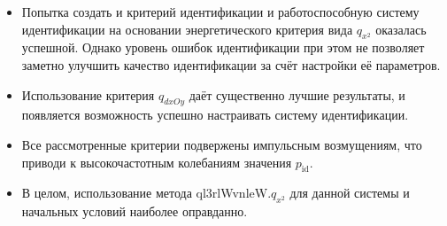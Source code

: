 \begin{itemize}

  \item
    Попытка создать и критерий идентификации и работоспособную систему идентификации
    на основании энергетического критерия вида $q_{x^2}$ оказалась успешной.
    Однако уровень ошибок идентификации при этом не позволяет
    заметно улучшить качество идентификации за счёт настройки её параметров.

  \item
    Использование критерия $q_{dxOy}$ даёт существенно лучшие результаты,
    и появляется возможность успешно настраивать систему идентификации.

  \item
    Все рассмотренные критерии подвержены импульсным возмущениям,
    что приводи к высокочастотным колебаниям значения $p_{\mathrm{id}}$.

  \item
    В целом, использование метода  ql3rlWvnleW.$q_{x^2}$ для данной системы
    и начальных условий наиболее оправданно.

\end{itemize}




